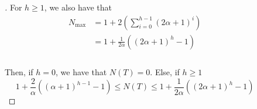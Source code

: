 \documentclass{beamer}
\begin{document}
\begin{frame}
    \begin{columns}
        \begin{column}{\textlecolumn}
            \begin{block}{}
                \begin{proof}[\unskip\nopunct]
                    For \(h \geq 1\), we also have that
                    \[
                        \begin{aligned}
                            N_{\text{max}} &= 1 + 2\left(\sum^{h - 1}_{i = 0} \left(2\alpha + 1\right)^i \right) \\
                            &= 1 + \frac{1}{2\alpha}\left(\left(2\alpha + 1\right)^{h} - 1\right) \\
                        \end{aligned}
                    \]
                    \\
                    Then, if \(h = 0\), we have that \(N\left(T\right) = 0\). Else, if \(h \geq 1\)
                    \[
                        1 + \frac{2}{\alpha}\left(\left(\alpha + 1\right)^{h - 1} - 1\right) 
                        \leq 
                        N\left(T\right) 
                        \leq 
                        1 + \frac{1}{2\alpha}\left(\left(2\alpha + 1\right)^{h} - 1\right)
                        \tag{Nodes Bounds}\label{btree-nodes-num}
                    \]
                \end{proof}
            \end{block}
        \end{column}
        \begin{column}{\textricolumn}
        \end{column}
    \end{columns}
\end{frame}
\end{document}
